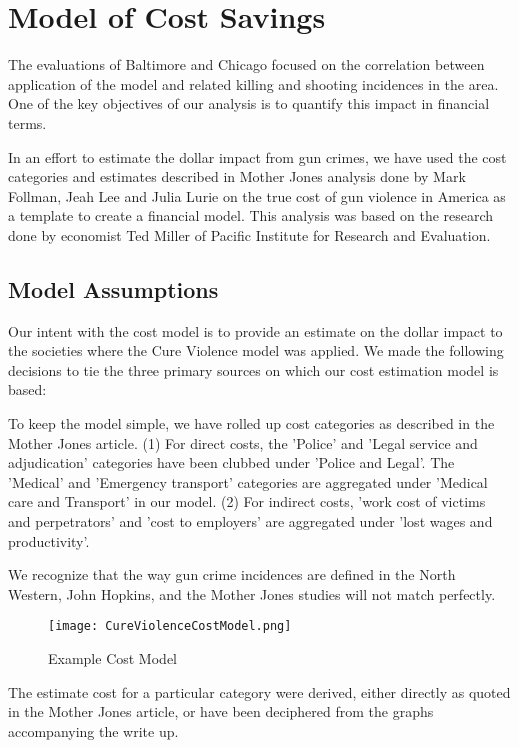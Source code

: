 \documentclass[11pt,preprint]{aastex}
\begin{document}
\section{Model of Cost Savings}
The evaluations of Baltimore and Chicago focused on the correlation between application of the model and related killing and shooting incidences in the area. One of the key objectives of our analysis is to quantify this impact in financial terms.  

In an effort to estimate the dollar impact from gun crimes, we have used the cost categories and estimates described in Mother Jones analysis done by Mark Follman, Jeah Lee and Julia Lurie on the true cost of gun violence in America as a template to create a financial model.  This analysis was based on the research done by economist Ted Miller of Pacific Institute for Research and Evaluation.  

\subsection*{Model Assumptions}
Our intent with the cost model is to provide an estimate on the dollar impact to the societies where the Cure Violence model was applied.  We made the following decisions to tie the three primary sources on which our cost estimation model is based:  

To keep the model simple, we have rolled up cost categories as described in the Mother Jones article.  (1)	For direct costs, the 'Police' and 'Legal service and adjudication' categories have been clubbed under 'Police and Legal'.  The 'Medical' and 'Emergency transport' categories are aggregated under 'Medical care and Transport' in our model. (2)	For indirect costs, 'work cost of victims and perpetrators' and 'cost to employers' are aggregated under 'lost wages and productivity'.

We recognize that the way gun crime incidences are defined in the North Western, John Hopkins, and the Mother Jones studies will not match perfectly.

\begin{figure}[h]
    \centering
    \texttt{[image: CureViolenceCostModel.png]}
    \caption{Example Cost Model}
    \label{fig:my_label}
\end{figure}

The estimate cost for a particular category were derived, either directly as quoted in the Mother Jones article, or have been deciphered from the graphs accompanying the write up.  
\end{document}
